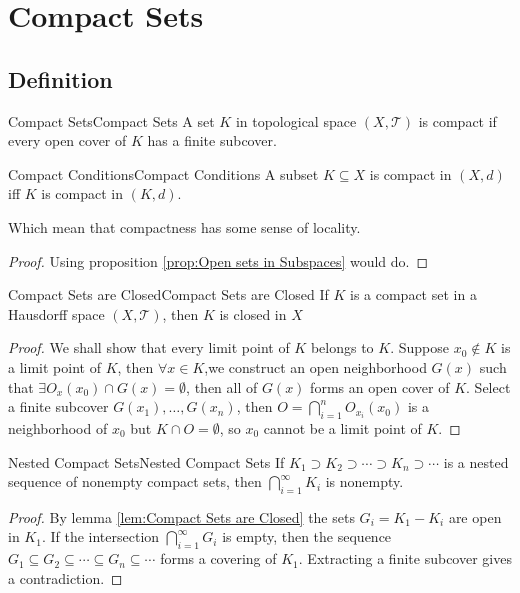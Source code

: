\documentclass[../main.tex]{subfiles}
\begin{document}
\section{Compact Sets}
\subsection{Definition}
\begin{definition}{Compact Sets}{Compact Sets}
A set $K$ in topological space $(X,\mathcal{T})$ is compact if every open cover of $K$ has a finite subcover.
\end{definition}

\begin{proposition}{Compact Conditions}{Compact Conditions}
A subset $K \subseteq X$ is compact in $(X,d)$ iff $K$ is compact in $(K,d)$.

Which mean that compactness has some sense of locality.
\end{proposition}
\begin{proof}
	Using proposition \ref{prop:Open sets in Subspaces} would do.
\end{proof}

\begin{lemma}{Compact Sets are Closed}{Compact Sets are Closed}
If $K$ is a compact set in a Hausdorff space $(X,\mathcal{T})$, then $K$ is closed in $X$
\end{lemma}
\begin{proof}
We shall show that every limit point of $K$ belongs to $K$. Suppose $x_0\notin K$ is a limit point of $K$, then $\forall x\in K$,we construct an open neighborhood $G(x)$ such that $\exists O_x(x_0)\cap G(x) = \emptyset $, then all of $G(x)$ forms an open cover of $K$. Select a finite subcover $G(x_1), \ldots ,G(x_n)$, then $O = \bigcap_{i=1}^{n} O_{x_i}(x_0)$ is a neighborhood of $x_0$ but $K\cap O = \emptyset $, so $x_0$ cannot be a limit point of $K$.
\end{proof}


\begin{lemma}{Nested Compact Sets}{Nested Compact Sets}
If $K_1 \supset K_2 \supset \cdots \supset K_n \supset \cdots $ is a nested sequence of nonempty compact sets, then $\bigcap_{i=1}^{\infty } K_i$ is nonempty.
\end{lemma}
\begin{proof}
	By lemma \ref{lem:Compact Sets are Closed} the sets $G_i = K_1-K_i$ are open in $K_1$. If the intersection $\bigcap_{i=1}^{\infty } G_i$ is empty, then the sequence $G_1 \subseteq G_2 \subseteq \cdots \subseteq G_n \subseteq  \cdots $ forms a covering of $K_1$. Extracting a finite subcover gives a contradiction.
\end{proof}
\end{document}
